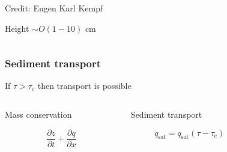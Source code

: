 \documentclass{beamer}
\begin{document}
\begin{frame}
\begin{columns}[t]
\begin{column}{0.5\paperwidth}
        \vspace{-0.8cm}

        \tiny Credit: Eugen Karl Kempf

        \vspace{0.9cm}

        \normalsize Height $\sim O(1 - 10)$ cm

      \end{column}

    \end{columns}

\end{frame}

\begin{frame}
  \frametitle{Sediment transport}

  \vspace{-0.5cm}

  If $\tau > \tau_{\text{c}}$ then transport is possible


  \begin{columns}[t]

    \begin{column}{0.3\textwidth}

      \centering

      Mass conservation 

      \vspace{-0.7cm}

      \begin{equation}
        \frac{\partial z}{\partial t} + \frac{\partial q}{\partial x} \nonumber
      \end{equation}

    \end{column}

    \begin{column}{0.3\textwidth}

      \centering

      Sediment transport

      \vspace{-0.7cm}

      \begin{equation}
        q_{\text{sat}} = q_{\text{sat}}(\tau - \tau_{\text{c}}) \nonumber
      \end{equation}

    \end{column}

    \begin{column}{0.3\textwidth}


\end{column}
\end{columns}
\end{frame}
\end{document}
